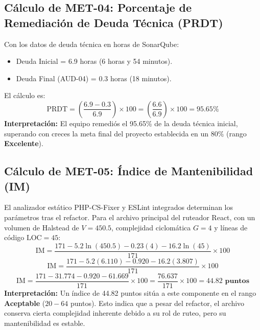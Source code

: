 \documentclass[12pt]{article}
\begin{document}
\subsection{Cálculo de MET-04: Porcentaje de Remediación de Deuda Técnica (PRDT)}
Con los datos de deuda técnica en horas de SonarQube:
\begin{itemize}
    \item Deuda Inicial = 6.9 horas (6 horas y 54 minutos).
    \item Deuda Final (AUD-04) = 0.3 horas (18 minutos).
\end{itemize}
El cálculo es:
\begin{equation}
    \text{PRDT} = \left( \frac{6.9 - 0.3}{6.9} \right) \times 100 = \left( \frac{6.6}{6.9} \right) \times 100 = \mathbf{95.65\%}
\end{equation}
\textbf{Interpretación:} El equipo remediós el 95.65\% de la deuda técnica inicial, superando con creces la meta final del proyecto establecida en un $80\%$ (rango \textcolor{process}{\textbf{Excelente}}).

\subsection{Cálculo de MET-05: Índice de Mantenibilidad (IM)}
El analizador estático PHP-CS-Fixer y ESLint integrados determinan los parámetros tras el refactor. Para el archivo principal del ruteador React, con un volumen de Halstead de $V = 450.5$, complejidad ciclomática $G = 4$ y líneas de código $\text{LOC} = 45$:
\begin{equation}
    \text{IM} = \frac{171 - 5.2 \ln(450.5) - 0.23(4) - 16.2 \ln(45)}{171} \times 100
\end{equation}
\begin{equation}
    \text{IM} = \frac{171 - 5.2 (6.110) - 0.920 - 16.2 (3.807)}{171} \times 100
\end{equation}
\begin{equation}
    \text{IM} = \frac{171 - 31.774 - 0.920 - 61.669}{171} \times 100 = \frac{76.637}{171} \times 100 = \mathbf{44.82\text{ puntos}}
\end{equation}
\textbf{Interpretación:} Un índice de 44.82 puntos sitúa a este componente en el rango \textcolor{value}{\textbf{Aceptable}} ($20 - 64$ puntos). Esto indica que a pesar del refactor, el archivo conserva cierta complejidad inherente debido a su rol de ruteo, pero su mantenibilidad es estable.

\newpage
\end{document}

